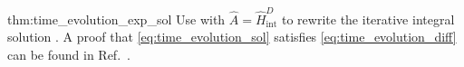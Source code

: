 \begin{delayedproof}{thm:time_evolution_exp_sol}
	Use  with $\hat{A}=\hat{H}_\text{int}^D$ to rewrite the iterative integral solution .
	A proof that \cref{eq:time_evolution_sol} satisfies \cref{eq:time_evolution_diff} can be found in Ref.~\cite[p.~219]{Greiner2013}.
\end{delayedproof}
